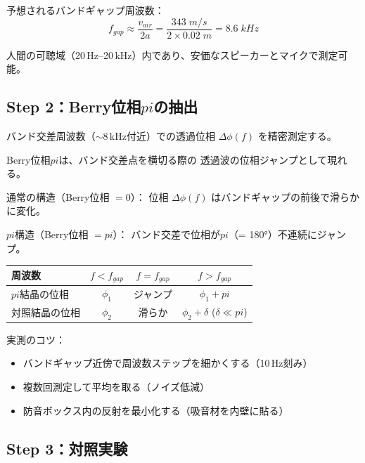 \documentclass[11pt,a4paper]{article}
\def\pi{pi}%
\def\mathrm#1{#1}%
\def\textbf#1{#1}%
\begin{document}
\textbf{予想されるバンドギャップ周波数}：
\begin{equation}
  f_{\mathrm{gap}} \approx \frac{v_{\mathrm{air}}}{2a}
  = \frac{343\;\mathrm{m/s}}{2 \times 0.02\;\mathrm{m}}
  = 8.6\;\mathrm{kHz}
\end{equation}

人間の可聴域（20\,Hz--20\,kHz）内であり、安価なスピーカーとマイクで測定可能。

\subsection{Step 2：Berry位相$\pi$の抽出}

バンド交差周波数（$\sim$8\,kHz付近）での透過位相 $\Delta\phi(f)$ を精密測定する。

\begin{tcolorbox}[colback=yellow!5,colframe=yellow!60!black,title=Berry位相の測定原理]
Berry位相$\pi$は、バンド交差点を横切る際の
透過波の\textbf{位相ジャンプ}として現れる。

\textbf{通常の構造}（Berry位相 $= 0$）：
位相 $\Delta\phi(f)$ はバンドギャップの前後で\textbf{滑らかに}変化。

\textbf{$\pi$構造}（Berry位相 $= \pi$）：
バンド交差で位相が$\pi$（= 180°）\textbf{不連続にジャンプ}。

\begin{center}
\begin{tabular}{lccc}
\toprule
周波数 & $f < f_{\mathrm{gap}}$ & $f = f_{\mathrm{gap}}$ & $f > f_{\mathrm{gap}}$ \\
\midrule
$\pi$結晶の位相 & $\phi_1$ & ジャンプ & $\phi_1 + \pi$ \\
対照結晶の位相 & $\phi_2$ & 滑らか & $\phi_2 + \delta$ ($\delta \ll \pi$) \\
\bottomrule
\end{tabular}
\end{center}
\end{tcolorbox}

実測のコツ：
\begin{itemize}
\item バンドギャップ近傍で周波数ステップを細かくする（10\,Hz刻み）
\item 複数回測定して平均を取る（ノイズ低減）
\item 防音ボックス内の反射を最小化する（吸音材を内壁に貼る）
\end{itemize}

\subsection{Step 3：対照実験}
\end{document}
